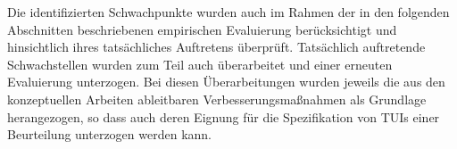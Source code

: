 Die identifizierten Schwachpunkte wurden auch im Rahmen der in den folgenden Abschnitten beschriebenen empirischen Evaluierung berücksichtigt und hinsichtlich ihres tatsächliches Auftretens überprüft. Tatsächlich auftretende Schwachstellen wurden zum Teil auch überarbeitet und einer erneuten Evaluierung unterzogen. Bei diesen Überarbeitungen wurden jeweils die aus den konzeptuellen Arbeiten ableitbaren Verbesserungsmaßnahmen als Grundlage herangezogen, so dass auch deren Eignung für die Spezifikation von \glspl{TUI} einer Beurteilung unterzogen werden kann.



